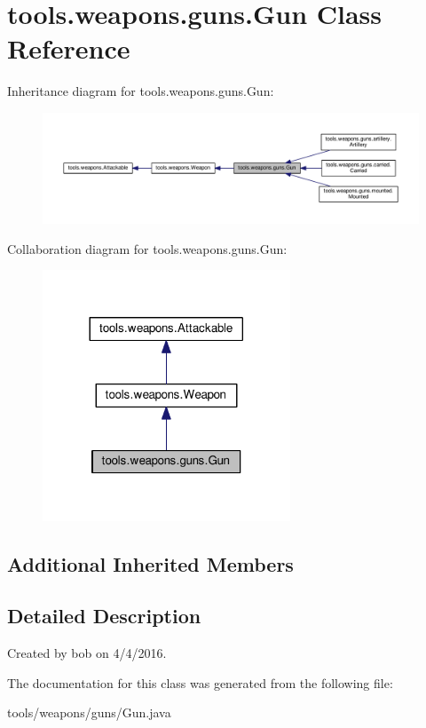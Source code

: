 \hypertarget{classtools_1_1weapons_1_1guns_1_1_gun}{}\section{tools.\+weapons.\+guns.\+Gun Class Reference}
\label{classtools_1_1weapons_1_1guns_1_1_gun}


Inheritance diagram for tools.\+weapons.\+guns.\+Gun\+:\nopagebreak
\begin{figure}[H]
\begin{center}
\leavevmode
\includegraphics[width=350pt]{classtools_1_1weapons_1_1guns_1_1_gun__inherit__graph}
\end{center}
\end{figure}


Collaboration diagram for tools.\+weapons.\+guns.\+Gun\+:\nopagebreak
\begin{figure}[H]
\begin{center}
\leavevmode
\includegraphics[width=209pt]{classtools_1_1weapons_1_1guns_1_1_gun__coll__graph}
\end{center}
\end{figure}
\subsection*{Additional Inherited Members}


\subsection{Detailed Description}
Created by bob on 4/4/2016. 

The documentation for this class was generated from the following file\+:\begin{DoxyCompactItemize}
\item 
tools/weapons/guns/Gun.\+java\end{DoxyCompactItemize}
